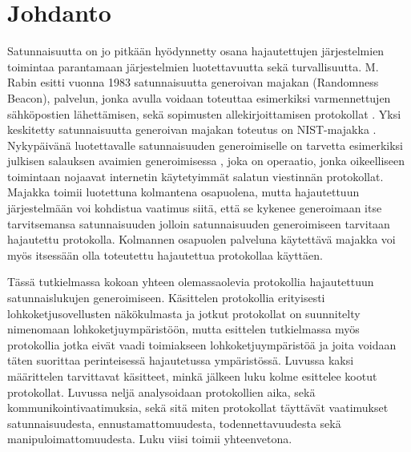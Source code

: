 \chapter{Johdanto\label{intro}}

Satunnaisuutta on jo pitkään hyödynnetty osana hajautettujen järjestelmien toimintaa parantamaan järjestelmien luotettavuutta sekä turvallisuutta. M. Rabin esitti vuonna 1983 satunnaisuutta generoivan majakan (Randomness Beacon), palvelun, jonka avulla voidaan toteuttaa esimerkiksi varmennettujen sähköpostien lähettämisen, sekä sopimusten allekirjoittamisen protokollat \cite{rabin_transaction_1983}. Yksi keskitetty satunnaisuutta generoivan majakan toteutus on NIST-majakka \cite{computer_security_division_interoperable_2019}. Nykypäivänä luotettavalle satunnaisuuden generoimiselle on tarvetta esimerkiksi julkisen salauksen avaimien generoimisessa \cite{corrigan-gibbs_ensuring_2014}, joka on operaatio, jonka oikeelliseen toimintaan nojaavat internetin käytetyimmät salatun viestinnän protokollat. Majakka toimii luotettuna kolmantena osapuolena, mutta hajautettuun järjestelmään voi kohdistua vaatimus siitä, että se kykenee generoimaan itse tarvitsemansa satunnaisuuden jolloin satunnaisuuden generoimiseen tarvitaan hajautettu protokolla. Kolmannen osapuolen palveluna käytettävä majakka voi myös itsessään olla toteutettu hajautettua protokollaa käyttäen.




Tässä tutkielmassa kokoan yhteen olemassaolevia protokollia hajautettuun satunnaislukujen generoimiseen.
Käsittelen protokollia erityisesti lohkoketjusovellusten näkökulmasta ja jotkut protokollat on suunnitelty nimenomaan lohkoketjuympäristöön, mutta esittelen tutkielmassa myös protokollia jotka eivät vaadi toimiakseen lohkoketjuympäristöä ja joita voidaan täten suorittaa perinteisessä hajautetussa ympäristössä. Luvussa kaksi määrittelen tarvittavat käsitteet, minkä jälkeen luku kolme esittelee kootut protokollat. Luvussa neljä analysoidaan protokollien aika, sekä kommunikointivaatimuksia, sekä sitä miten protokollat täyttävät vaatimukset satunnaisuudesta, ennustamattomuudesta, todennettavuudesta sekä manipuloimattomuudesta. Luku viisi toimii yhteenvetona.